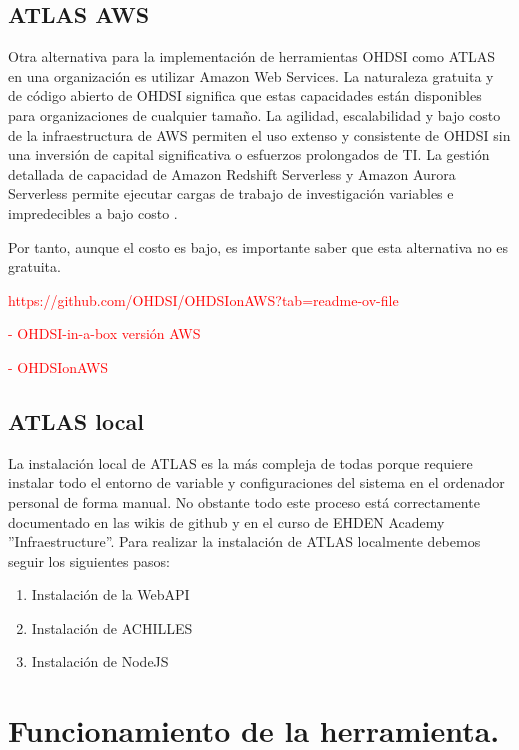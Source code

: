 \documentclass{article}
\begin{document}

\newpage
\subsection{ATLAS AWS}\label{cap:AtlasAWS}

Otra alternativa para la implementación de herramientas OHDSI como ATLAS en una organización es utilizar Amazon Web Services. La naturaleza gratuita y de código abierto de OHDSI significa que estas capacidades están disponibles para organizaciones de cualquier tamaño. La agilidad, escalabilidad y bajo costo de la infraestructura de AWS permiten el uso extenso y consistente de OHDSI sin una inversión de capital significativa o esfuerzos prolongados de TI. La gestión detallada de capacidad de Amazon Redshift Serverless y Amazon Aurora Serverless permite ejecutar cargas de trabajo de investigación variables e impredecibles a bajo costo \cite{OHDSIAWS}. 

Por tanto, aunque el costo es bajo, es importante saber que esta alternativa no es gratuita.


\textcolor{red}{https://github.com/OHDSI/OHDSIonAWS?tab=readme-ov-file}

\textcolor{red}{- OHDSI-in-a-box versión AWS}

\textcolor{red}{- OHDSIonAWS}


\subsection{ATLAS local} \label{cap:ATLASlocal}

La instalación local de ATLAS es la más compleja de todas porque requiere instalar todo el entorno de variable y configuraciones del sistema en el ordenador personal de forma manual. No obstante todo este proceso está correctamente documentado en las wikis de github \cite{AtlasSetup} y en el curso de EHDEN Academy \cite{EHDENAcademy} ''Infraestructure''. Para realizar la instalación de ATLAS localmente debemos seguir los siguientes pasos:

\begin{enumerate}
    \item Instalación de la WebAPI
    \item Instalación de ACHILLES
    \item Instalación de NodeJS
\end{enumerate}



\newpage
\section{Funcionamiento de la herramienta.}




\newpage


\end{document}
